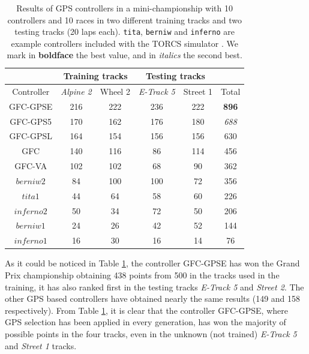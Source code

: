 \documentclass[10pt,journal,compsoc]{IEEEtran}
\begin{document}
\begin{table}[ht]
	\centering
	{\scriptsize
		\caption{ Results of GPS controllers in a mini-championship
			with 10 controllers and 10 races in two different training tracks and two testing tracks (20 laps each). {\tt tita}, {\tt berniw} and {\tt	inferno} are example controllers included with the TORCS
			simulator \cite{torcs4}. We mark in {\bf boldface}
                      the best value, and in {\em italics} the second best.}
		{
                  \begin{tabular}{|c|c|c|c|c||c|}
                    \hline
                    & \multicolumn{2}{|c|}{Training tracks} &\multicolumn{2}{|c|}{Testing tracks} \\
                    \hline
                    Controller&\textit{Alpine 2} &Wheel 2&\textit{E-Track 5}  &Street 1&Total\\
				\hline
				\hline
			{\sf GFC-GPSE}&216&222&236&222&{\bf 896}\\	
			{\sf GFC-GPS5}\cite{DBLP:conf/cig/SalemMG19}&170&162&176&180&{\em688}\\
			
			{\sf GFC-GPSL}\cite{DBLP:conf/cig/SalemMG19}&164&154&156&156&630\\
			{\sf GFC} \cite{salem_cig2018}	&140&116& 86&114&456\\
			{\sf GFC-VA}\cite{DBLP:conf/cig/SalemMG19}	&102&102& 68& 90&362\\



			$berniw2$	& 84&100&100& 72&356\\
			$tita1$	&44 & 64& 58& 60&226\\
			$inferno2$& 50& 34& 72& 50&206\\				
			$berniw1$	& 24& 26& 42& 52&144\\			
			$inferno1$& 16& 30& 16& 14& 76\\			
			
				\hline

				
			\end{tabular}
		}\label{tab:RSresults}
	}
\end{table}
%

As it could be noticed in Table \ref{tab:RSresults}, the controller {\sf GFC-GPSE} has won the Grand Prix championship obtaining 438 points from 500 in the tracks used in the training, it has also ranked first in the testing tracks  \textit{E-Track 5} and \textit{Street 2}. 
The other GPS based controllers have obtained nearly the same results (149 and 158 respectively).
From Table \ref{tab:RSresults}, it is clear that the controller {\sf GFC-GPSE}, where GPS selection has been applied in every generation, has won the majority of possible points in the four tracks, even in the unknown (not trained) \textit{E-Track 5}  and \textit{Street 1} tracks.
\end{document}
